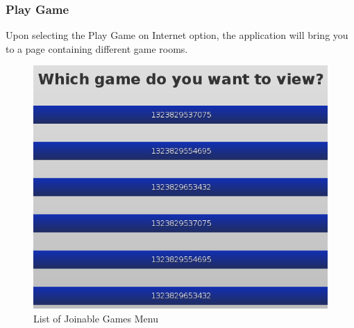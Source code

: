 \documentclass[12pt]{article}
\begin{document}
\subsubsection{Play Game}
Upon selecting the Play Game on Internet option, the application will bring you to a page containing different game rooms. 
\begin{figure}
\begin{center}
\includegraphics[scale=.7]{ gameSelect.png}
\caption{\label{gameSelection}List of Joinable Games Menu}
\end{center}
\end{figure}
\end{document}
